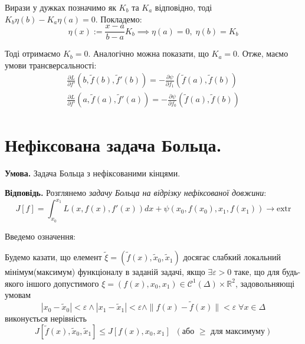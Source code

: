\documentclass[14pt]{extarticle}
\newcommand{\<}{\langle}
\renewcommand{\>}{\rangle}
\theoremstyle{mystyle}{\newtheorem{definition}{Definition}[section]}
\theoremstyle{mystyle}{\newtheorem{proposition}[definition]{Proposition}}
\theoremstyle{mystyle}{\newtheorem{theorem}[definition]{Theorem}}
\theoremstyle{mystyle}{\newtheorem{lemma}[definition]{Lemma}}
\theoremstyle{mystyle}{\newtheorem{corollary}[definition]{Corollary}}
\theoremstyle{mystyle}{\newtheorem*{remark}{Remark}}
\theoremstyle{mystyle}{\newtheorem*{remarks}{Remarks}}
\theoremstyle{mystyle}{\newtheorem*{example}{Example}}
\theoremstyle{mystyle}{\newtheorem*{examples}{Examples}}
\theoremstyle{definition}{\newtheorem*{exercise}{Exercise}}
\theoremstyle{cstyle}{\newtheorem*{cthm}{}}
\theoremstyle{warn}
\begin{document}
Вирази у дужках позначимо як $K_b$ та $K_a$ відповідно, тоді $K_b\eta(b)-K_a\eta(a)=0$. Покладемо:
\begin{equation}
    \eta(x) := \frac{x-a}{b-a}K_b \implies \eta(a) = 0, \; \eta(b)=K_b
\end{equation}

Тоді отримаємо $K_b=0$. Аналогічно можна показати, що $K_a=0$. Отже, маємо умови трансверсальності:
\begin{gather}
    \frac{\partial L}{\partial f'}(b,\widetilde{f}(b),\widetilde{f}'(b)) = -\frac{\partial \psi}{\partial f_1}(\widetilde{f}(a), \widetilde{f}(b)) \\
    \frac{\partial L}{\partial f'}(a,\widetilde{f}(a),\widetilde{f}'(a)) = -\frac{\partial \psi}{\partial f_0}(\widetilde{f}(a), \widetilde{f}(b)) 
\end{gather}

\pagebreak

\section{Нефіксована задача Больца.}

\textbf{Умова.} Задача Больца з нефіксованими кінцями.

\textbf{Відповідь.} Розглянемо \textit{задачу Больца на відрізку нефіксованої довжини}:
\begin{equation}
    J[f] = \int_{x_0}^{x_1} L(x,f(x),f'(x))dx + \psi(x_0,f(x_0),x_1,f(x_1)) \to \text{extr}
\end{equation}

Введемо означення:
\begin{definition}
    Будемо казати, що елемент $\widetilde{\xi}=(\widetilde{f}(x),\widetilde{x}_0,\widetilde{x}_1)$ досягає слабкий локальний мінімум(максимум) функціоналу в заданій задачі, якщо $\exists \varepsilon>0$ таке, що
    для будь-якого іншого допустимого $\xi=(f(x),x_0,x_1) \in \mathcal{C}^1(\Delta) \times \mathbb{R}^2$, задовольняющі умовам
    \begin{equation}
        |x_0-\widetilde{x}_0| < \varepsilon \wedge |x_1-\widetilde{x}_1| < \varepsilon \wedge \|f(x)-\widetilde{f}(x)\| < \varepsilon \; \forall x \in \Delta
    \end{equation}
    виконується нерівність
    \begin{equation}
        J[\widetilde{f}(x),\widetilde{x}_0,\widetilde{x}_1] \leq J[f(x),x_0,x_1] \; \; (\text{або $\geq$ для максимуму})
    \end{equation}
\end{definition}
\end{document}
